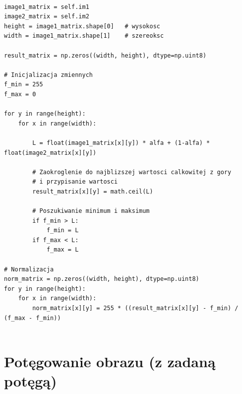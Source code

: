 \documentclass[final,a4paper,openany,12pt]{mwbk}
\begin{document}
\begin{lstlisting}[caption=Mieszanie obrazów szarych z określonym współczynnikiem]

image1_matrix = self.im1
image2_matrix = self.im2
height = image1_matrix.shape[0]   # wysokosc
width = image1_matrix.shape[1]    # szereoksc

result_matrix = np.zeros((width, height), dtype=np.uint8)

# Inicjalizacja zmiennych
f_min = 255
f_max = 0

for y in range(height):
    for x in range(width):  

        L = float(image1_matrix[x][y]) * alfa + (1-alfa) * float(image2_matrix[x][y])

        # Zaokroglenie do najblizszej wartosci calkowitej z gory
        # i przypisanie wartosci
        result_matrix[x][y] = math.ceil(L)

        # Poszukiwanie minimum i maksimum
        if f_min > L:
            f_min = L
        if f_max < L:
            f_max = L

# Normalizacja
norm_matrix = np.zeros((width, height), dtype=np.uint8)
for y in range(height):
    for x in range(width):
        norm_matrix[x][y] = 255 * ((result_matrix[x][y] - f_min) / (f_max - f_min))
        
\end{lstlisting}



\section {Potęgowanie obrazu (z zadaną potęgą)}

\hfill
\\\\
\indent
\end{document}
